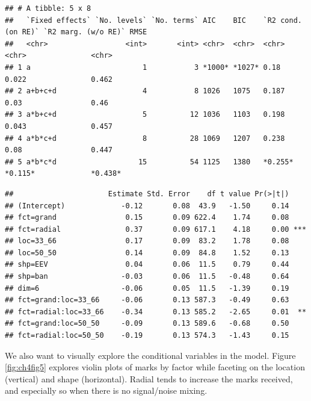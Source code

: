 \documentclass{template/monashthesis}
\begin{document}
\begin{verbatim}
## # A tibble: 5 x 8
##   `Fixed effects` `No. levels` `No. terms` AIC    BIC    `R2 cond. (on RE)` `R2 marg. (w/o RE)` RMSE   
##   <chr>                  <int>       <int> <chr>  <chr>  <chr>              <chr>               <chr>  
## 1 a                          1           3 *1000* *1027* 0.18               0.022               0.462  
## 2 a+b+c+d                    4           8 1026   1075   0.187              0.03                0.46   
## 3 a*b+c+d                    5          12 1036   1103   0.198              0.043               0.457  
## 4 a*b*c+d                    8          28 1069   1207   0.238              0.08                0.447  
## 5 a*b*c*d                   15          54 1125   1380   *0.255*            *0.115*             *0.438*
\end{verbatim}

\begin{verbatim}
##                      Estimate Std. Error    df t value Pr(>|t|)    
## (Intercept)             -0.12       0.08  43.9   -1.50     0.14    
## fct=grand                0.15       0.09 622.4    1.74     0.08    
## fct=radial               0.37       0.09 617.1    4.18     0.00 ***
## loc=33_66                0.17       0.09  83.2    1.78     0.08    
## loc=50_50                0.14       0.09  84.8    1.52     0.13    
## shp=EEV                  0.04       0.06  11.5    0.79     0.44    
## shp=ban                 -0.03       0.06  11.5   -0.48     0.64    
## dim=6                   -0.06       0.05  11.5   -1.39     0.19    
## fct=grand:loc=33_66     -0.06       0.13 587.3   -0.49     0.63    
## fct=radial:loc=33_66    -0.34       0.13 585.2   -2.65     0.01  **
## fct=grand:loc=50_50     -0.09       0.13 589.6   -0.68     0.50    
## fct=radial:loc=50_50    -0.19       0.13 574.3   -1.43     0.15
\end{verbatim}

We also want to visually explore the conditional variables in the model. Figure \ref{fig:ch4fig5} explores violin plots of marks by factor while faceting on the location (vertical) and shape (horizontal). Radial tends to increase the marks received, and especially so when there is no signal/noise mixing.
\end{document}
